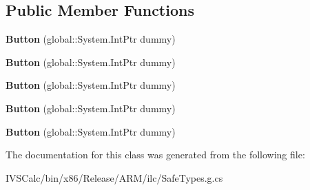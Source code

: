 \subsection*{Public Member Functions}
\begin{DoxyCompactItemize}
\item 
\mbox{\label{class_windows_1_1_u_i_1_1_xaml_1_1_controls_1_1_button_a4985fd903f1541c4ba21d2c2a3537d65}} 
{\bfseries Button} (global\+::\+System.\+Int\+Ptr dummy)
\item 
\mbox{\label{class_windows_1_1_u_i_1_1_xaml_1_1_controls_1_1_button_a4985fd903f1541c4ba21d2c2a3537d65}} 
{\bfseries Button} (global\+::\+System.\+Int\+Ptr dummy)
\item 
\mbox{\label{class_windows_1_1_u_i_1_1_xaml_1_1_controls_1_1_button_a4985fd903f1541c4ba21d2c2a3537d65}} 
{\bfseries Button} (global\+::\+System.\+Int\+Ptr dummy)
\item 
\mbox{\label{class_windows_1_1_u_i_1_1_xaml_1_1_controls_1_1_button_a4985fd903f1541c4ba21d2c2a3537d65}} 
{\bfseries Button} (global\+::\+System.\+Int\+Ptr dummy)
\item 
\mbox{\label{class_windows_1_1_u_i_1_1_xaml_1_1_controls_1_1_button_a4985fd903f1541c4ba21d2c2a3537d65}} 
{\bfseries Button} (global\+::\+System.\+Int\+Ptr dummy)
\end{DoxyCompactItemize}


The documentation for this class was generated from the following file\+:\begin{DoxyCompactItemize}
\item 
I\+V\+S\+Calc/bin/x86/\+Release/\+A\+R\+M/ilc/Safe\+Types.\+g.\+cs\end{DoxyCompactItemize}
